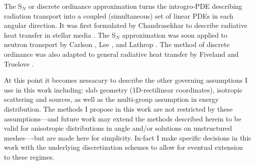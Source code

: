 The S$_N$ or discrete ordinance approximation turns the introgro-PDE describing radiation transport into a coupled (simultaneous) set of linear PDEs in each angular direction.
It was first formulated by Chandrasekhar to describe radiative heat transfer in stellar media \cite{chandrasekhar1960radiative}.
The S$_N$ approximation was soon applied to neutron transport by Carlson \cite{precise1971carlson}, Lee \cite{discrete1961lee}, and Lathrop \cite{discrete1966lathnrop}.
The method of discrete ordinance was also adapted to general radiative heat transfer by Fiveland \cite{three1988fiveland} and Truelove \cite{discrete1987truelove}.

At this point it becomes nessacary to describe the other governing assumptions I use in this work including:
slab geometry (1D-rectilinear coordinates), isotropic scattering and sources, as well as the multi-group assumption in energy distribution.
The methods I propose in this work are not restricted by these assumptions---and future work may extend the methods described herein to be valid for anisotropic distributions in angle and/or solutions on unstructured meshes----but are made here for simplicity.
In-fact I make specific decisions in this work with the underlying discretization schemes to allow for eventual extension to these regimes.

